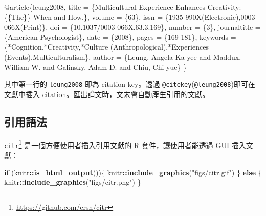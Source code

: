 \documentclass[oneside]{book}
\newenvironment{Shaded}{\begin{snugshade}}{\end{snugshade}}
\newcommand{\KeywordTok}[1]{\textcolor[rgb]{0.13,0.29,0.53}{\textbf{#1}}}
\newcommand{\DataTypeTok}[1]{\textcolor[rgb]{0.13,0.29,0.53}{#1}}
\newcommand{\StringTok}[1]{\textcolor[rgb]{0.31,0.60,0.02}{#1}}
\newcommand{\OtherTok}[1]{\textcolor[rgb]{0.56,0.35,0.01}{#1}}
\newcommand{\VariableTok}[1]{\textcolor[rgb]{0.00,0.00,0.00}{#1}}
\newcommand{\ControlFlowTok}[1]{\textcolor[rgb]{0.13,0.29,0.53}{\textbf{#1}}}
\newcommand{\OperatorTok}[1]{\textcolor[rgb]{0.81,0.36,0.00}{\textbf{#1}}}
\newcommand{\NormalTok}[1]{#1}
\renewcommand{\href}[2]{#2\footnote{\url{#1}}}
\theoremstyle{definition}
\theoremstyle{definition}
\theoremstyle{definition}
\theoremstyle{remark}
\begin{document}
\begin{Shaded}
\begin{Highlighting}[]
\VariableTok{@article}\NormalTok{\{}\OtherTok{leung2008}\NormalTok{,}
  \DataTypeTok{title}\NormalTok{ = \{Multicultural Experience Enhances Creativity: \{\{The\}\} When and How.\},}
  \DataTypeTok{volume}\NormalTok{ = \{63\},}
  \DataTypeTok{issn}\NormalTok{ = \{1935-990X(Electronic),0003-066X(Print)\},}
  \DataTypeTok{doi}\NormalTok{ = \{10.1037/0003-066X.63.3.169\},}
  \DataTypeTok{number}\NormalTok{ = \{3\},}
  \DataTypeTok{journaltitle}\NormalTok{ = \{American Psychologist\},}
  \DataTypeTok{date}\NormalTok{ = \{2008\},}
  \DataTypeTok{pages}\NormalTok{ = \{169-181\},}
  \DataTypeTok{keywords}\NormalTok{ = \{*Cognition,*Creativity,*Culture (Anthropological),*Experiences (Events),Multiculturalism\},}
  \DataTypeTok{author}\NormalTok{ = \{Leung, Angela Ka-yee and Maddux, William W. and Galinsky, Adam D. and Chiu, Chi-yue\}}
\NormalTok{\}}
\end{Highlighting}
\end{Shaded}

其中第一行的 \texttt{leung2008} 即為 citation key。透過
\texttt{@citekey}(\texttt{@leung2008})即可在文獻中插入
citation。匯出論文時，文末會自動產生引用的文獻。

\subsection{引用語法}\label{cite-syntax}

\href{https://github.com/crsh/citr}{\texttt{citr}}
是一個方便使用者插入引用文獻的 R 套件，讓使用者能透過 GUI 插入文獻：

\begin{Shaded}
\begin{Highlighting}[]
\ControlFlowTok{if}\NormalTok{ (knitr}\OperatorTok{::}\KeywordTok{is_html_output}\NormalTok{())\{}
\NormalTok{  knitr}\OperatorTok{::}\KeywordTok{include_graphics}\NormalTok{(}\StringTok{"figs/citr.gif"}\NormalTok{)}
\NormalTok{\} }\ControlFlowTok{else}\NormalTok{ \{}
\NormalTok{  knitr}\OperatorTok{::}\KeywordTok{include_graphics}\NormalTok{(}\StringTok{"figs/citr.png"}\NormalTok{)}
\NormalTok{\}}
\end{Highlighting}
\end{Shaded}
\end{document}
